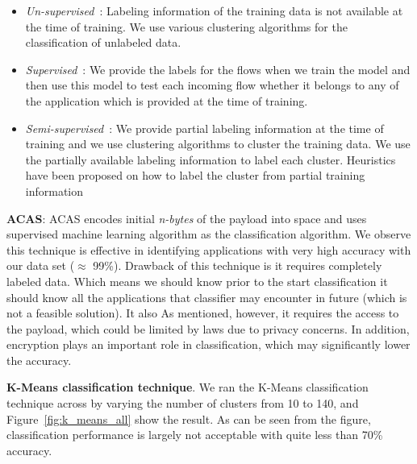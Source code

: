 \documentclass[conference]{IEEEtran}
\begin{document}
\begin{itemize} \itemsep3pt \parskip3pt 
	\item \emph{Un-supervised}~\cite{}:
	Labeling information of the training data is not available at the time of training. We use various clustering algorithms for the classification of unlabeled data\cite{}.
	\item \emph{Supervised}~\cite{}:
	We provide the labels for the flows when we train the model and then use this model to test each incoming flow whether it belongs to any of the application which is provided at the time of training\cite{}.
	\item \emph{Semi-supervised}~\cite{}:
	We provide partial labeling information at the time of training and we use clustering algorithms to cluster the training data. We use the partially available labeling information to label each cluster. Heuristics have been proposed on how to label the cluster from partial training information\cite{}
\end{itemize}


\textbf{ACAS}\cite{ACAS}: ACAS encodes initial \textit{n-bytes} of the payload into space and uses supervised machine learning algorithm as the classification algorithm. We observe this technique is effective in identifying applications with very high accuracy with our data set ($\approx$ 99\%). Drawback of this technique is it requires completely labeled data. Which means we should know prior to the start classification it should know all the applications that classifier may encounter in future (which is not a feasible solution). It also
As mentioned, however, it requires the access to the payload, which could be limited by laws due to privacy concerns. In addition, encryption plays an important role in classification, which may significantly lower the accuracy.

\textbf{K-Means classification technique}\cite{Erman:2006:TCU:1162678.1162679}.
We ran the K-Means classification technique across by varying the number of clusters from 10 to 140, and Figure~\ref{fig:k_means_all} show the result.
As can be seen from the figure, classification performance is largely not acceptable with quite less than 70\% accuracy.
\end{document}

